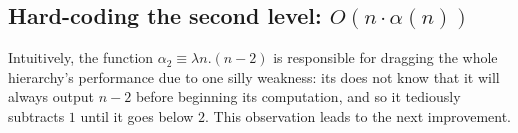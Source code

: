 
\subsection{Hard-coding the second level: $O(n\cdot\alpha(n))$} \label{sect: hard-code-lvl2}

Intuitively, the function $\alpha_2 \equiv \lambda n.(n-2)$ is responsible for dragging the whole hierarchy's performance due to one silly weakness: its does not know that it will always output $n-2$ before beginning its computation, and so it tediously subtracts $1$ until it goes below $2$. This observation leads to the next improvement.

